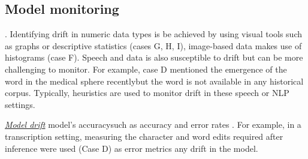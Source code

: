 
\DIFaddbegin 

\DIFaddend %
\subsection{Model monitoring} 

\underline{\DIFdelbegin \emph{}%
\DIFdelend \DIFaddbegin \emph{}\DIFaddend } \DIFdelbegin {}\DIFdelend \DIFaddbegin {}\DIFaddend . Identifying drift in numeric data types is be achieved by using visual tools such as graphs or descriptive statistics (cases G, H, I), image-based data makes use of histograms (case F). Speech and \DIFdelbegin {}\DIFdelend \DIFaddbegin {}\DIFaddend data is also susceptible to drift but can be more challenging to monitor. For example, case D mentioned the emergence of the word \DIFdelbegin {}\DIFdelend \DIFaddbegin {}\DIFaddend in the medical sphere recently\DIFaddbegin \DIFadd{, }\DIFaddend but the word is not available in any historical corpus. Typically, heuristics are used to monitor drift in these speech or NLP settings.

\underline{\emph{Model drift}} \DIFdelbegin {}\DIFdelend \DIFaddbegin {}\DIFaddend model's accuracy\DIFdelbegin {}\DIFdelend \DIFaddbegin {}\DIFaddend such as accuracy and error rates \DIFdelbegin {}\DIFdelend \DIFaddbegin {}\DIFaddend . For example, in a transcription setting, measuring the character and word edits required after inference were used (Case D) as error metrics \DIFdelbegin {}\DIFdelend \DIFaddbegin {}\DIFaddend any drift in the model.

